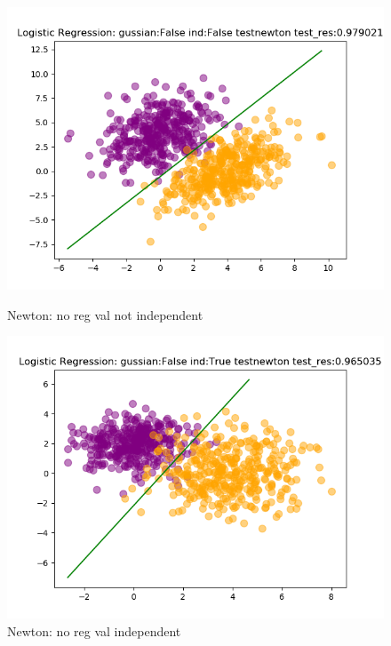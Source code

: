 \documentclass{article}
\begin{document}
\begin{figure}[h]
    \begin{minipage}[t]{0.4\linewidth}
    \centering
    \includegraphics[width=1.2\textwidth]{pic/LogisticRegression_gussian=Falseind=Falsetestnewton.png}
    \caption{Newton: no reg val not independent}
    \label{fig:Newton: no reg val not independent}
    \end{minipage}
    \hfill
    \begin{minipage}[t]{0.4\linewidth}
    \centering
    \includegraphics[width=1.2\textwidth]{pic/LogisticRegression_gussian=Falseind=Truetestnewton.png}
    \caption{Newton: no reg val independent}
    \label{fig:Newton: no reg val independent}
    \end{minipage}
\end{figure}
\end{document}
